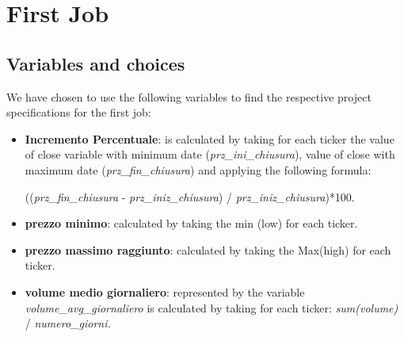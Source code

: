 \documentclass[]{report}
\begin{document}
\chapter*{First Job}
\section*{Variables and choices}
We have chosen to use the following variables to find the respective project specifications for the first job:
\begin{itemize}
	\item \textbf{Incremento Percentuale}: is calculated by taking for each ticker the value of close variable with minimum date (\textit{prz\_ini\_chiusura}), value of close with maximum date (\textit{prz\_fin\_chiusura}) and applying the following formula:
	\begin{center}
			((\textit{prz\_fin\_chiusura} - \textit{prz\_iniz\_chiusura}) / \textit{prz\_iniz\_chiusura})*100.
	\end{center}
	\item \textbf{prezzo minimo}: calculated by taking the min (low) for each ticker.
	
	\item \textbf{prezzo massimo raggiunto}: calculated by taking the Max(high) for each ticker.
	
	\item \textbf{volume medio giornaliero}: represented by the variable \textit{volume\_avg\_giornaliero} is calculated by taking for each ticker:\textit{ sum(volume)} / \textit{numero\_giorni.}
\end{itemize}
\end{document}

